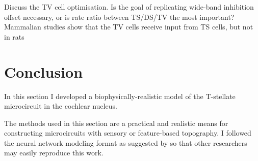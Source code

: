 \documentclass[11pt,a4paper,twoside]{book} %
\begin{document}
\medskip{}

Discuss the TV cell optimisation. Is the goal of replicating wide-band
inhibition offset necessary, or is rate ratio between TS/DS/TV the
most important?  Mammalian studies show that the TV cells receive
input from TS cells, but not in rats


\section{Conclusion}


In this section I developed a biophysically-realistic model of the
T-stellate microcircuit in the cochlear nucleus.

\medskip{}

The methods used in this section are a practical and realistic means
for constructing microcircuits with sensory or feature-based
topography.  I followed the neural network modeling format as
suggested by \citet{NordlieGewaltigEtAl:2009} so that other
researchers may easily reproduce this work.



 
\end{document}
